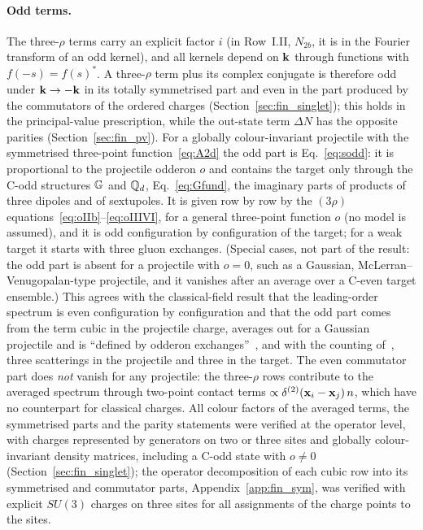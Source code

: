 \paragraph{Odd terms.} The three-$\rho$ terms carry an explicit factor $i$ (in Row~I.II, $N_{2b}$, it is in the Fourier transform of an odd kernel), and all kernels depend on $\mathbf{k}$ through functions with $f(-s)=f(s)^*$. A three-$\rho$ term plus its complex conjugate is therefore odd under $\mathbf{k}\to-\mathbf{k}$ in its totally symmetrised part and even in the part produced by the commutators of the ordered charges (Section~\ref{sec:fin_singlet}); this holds in the principal-value prescription, while the out-state term $\Delta N$ has the opposite parities (Section~\ref{sec:fin_pv}). For a globally colour-invariant projectile with the symmetrised three-point function~\eqref{eq:A2d} the odd part is Eq.~\eqref{eq:sodd}: it is proportional to the projectile odderon $o$ and contains the target only through the C-odd structures $\mathbb{G}$ and $\mathbb{Q}_d$, Eq.~\eqref{eq:Gfund}, the imaginary parts of products of three dipoles and of sextupoles. It is given row by row by the $(3\rho)$ equations~\eqref{eq:oIIb}--\eqref{eq:oIIIVI}, for a general three-point function $o$ (no model is assumed), and it is odd configuration by configuration of the target; for a weak target it starts with three gluon exchanges. (Special cases, not part of the result: the odd part is absent for a projectile with $o=0$, such as a Gaussian, McLerran--Venugopalan-type projectile, and it vanishes after an average over a C-even target ensemble.) This agrees with the classical-field result that the leading-order spectrum is even configuration by configuration and that the odd part comes from the term cubic in the projectile charge, averages out for a Gaussian projectile and is ``defined by odderon exchanges''~\cite{McLerran:2016snu}, and with the counting of~\cite{Kovchegov:2018jun}, three scatterings in the projectile and three in the target. The even commutator part does \emph{not} vanish for any projectile: the three-$\rho$ rows contribute to the averaged spectrum through two-point contact terms $\propto\delta^{(2)}(\mathbf{x}_i-\mathbf{x}_j)\,n$, which have no counterpart for classical charges. All colour factors of the averaged terms, the symmetrised parts and the parity statements were verified at the operator level, with charges represented by generators on two or three sites and globally colour-invariant density matrices, including a C-odd state with $o\neq0$ (Section~\ref{sec:fin_singlet}); the operator decomposition of each cubic row into its symmetrised and commutator parts, Appendix~\ref{app:fin_sym}, was verified with explicit $SU(3)$ charges on three sites for all assignments of the charge points to the sites.

